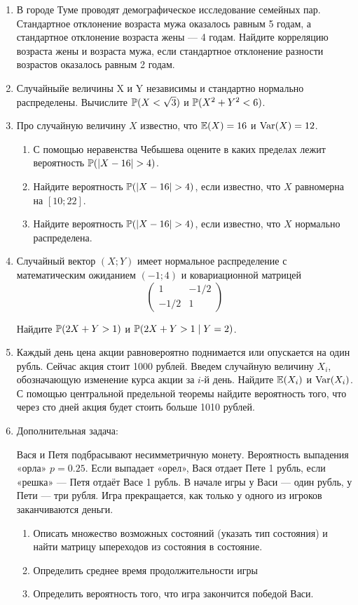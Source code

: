 \begin{enumerate}
\item В городе Туме проводят демографическое исследование семейных пар. Стандартное
отклонение возраста мужа оказалось равным 5 годам, а стандартное отклонение возраста
жены — 4 годам. Найдите корреляцию возраста жены и возраста мужа, если стандартное
отклонение разности возрастов оказалось равным 2 годам.
\item Случайныйе величины X и Y независимы и стандартно нормально распределены.
Вычислите $\P(X < \sqrt{3})$ и $\P(X^2 + Y^2 < 6)$.
\item  Про случайную величину $X$ известно, что $\E(X) = 16$ и $\Var(X) = 12$.
\begin{enumerate}
\item С помощью неравенства Чебышева оцените в каких пределах лежит вероятность
$\P(|X - 16| > 4)$.
\item Найдите вероятность $\P(|X - 16| > 4)$, если известно, что $X$ равномерна
на $[10;22]$.
\item Найдите вероятность $\P(|X - 16| > 4)$, если известно, что $X$ нормально
распределена.
\end{enumerate}

\item Случайный вектор $(X;Y)$ имеет нормальное распределение с математическим
ожиданием $(-1;4)$ и ковариационной матрицей
\[
\begin{pmatrix}
1 & -1/2 \\
-1/2 & 1
\end{pmatrix}
\]

Найдите $\P(2X+Y>1)$ и $\P(2X+Y>1 \mid Y=2)$.

\item Каждый день цена акции равновероятно поднимается или опускается на один рубль.
Сейчас акция стоит 1000 рублей. Введем случайную величину $X_i$, обозначающую
изменение курса акции за $i$-й день. Найдите $\E(X_i)$  и $\Var(X_i)$. С помощью
центральной предельной теоремы найдите вероятность того, что через сто дней акция
будет стоить больше 1010 рублей.

\item Дополнительная задача:

Вася и Петя подбрасывают несимметричную монету. Вероятность выпадения «орла»
$p = 0.25$. Если выпадает «орел», Вася отдает Пете 1 рубль, если «решка» — Петя
отдаёт Васе 1 рубль. В начале игры у Васи — один рубль, у Пети — три рубля. Игра
прекращается, как только у одного из игроков заканчиваются деньги.
\begin{enumerate}
\item Описать множество возможных состояний (указать тип состояния) и найти матрицу
ыпереходов из состояния в состояние.
\item Определить среднее время продолжительности игры
\item Определить вероятность того, что игра закончится победой Васи.
\end{enumerate}
\end{enumerate}



